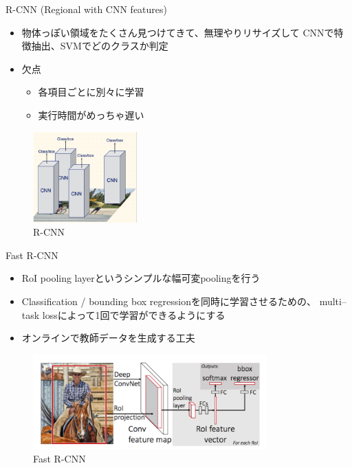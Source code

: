 \documentclass[aspectratio=169, dvipdfmx, 11pt]{beamer}
\begin{document}
\begin{frame}{R-CNN (Regional with CNN features)}
    \begin{itemize}
        \item 物体っぽい領域をたくさん見つけてきて、無理やりリサイズして
        CNNで特徴抽出、SVMでどのクラスか判定 \\
        \item 欠点 \\
        \begin{itemize}
            \item 各項目ごとに別々に学習 \\
            \item 実行時間がめっちゃ遅い \\
        \end{itemize}
    \end{itemize}
    \begin{figure}
        \centering
		\includegraphics[width=4cm]{./figures/rcnn2.png}
        \caption{R-CNN}
    \end{figure}
\end{frame}


\begin{frame}{Fast R-CNN}
    \begin{itemize}
    	\item RoI pooling layerというシンプルな幅可変poolingを行う \\
    	\item Classification / bounding box regressionを同時に学習させるための、
        multi–task lossによって1回で学習ができるようにする \\
        \item オンラインで教師データを生成する工夫 \\
    \end{itemize}
    \begin{figure}
        \centering
		\includegraphics[width=9cm]{./figures/fast_rcnn1.png}
        \caption{Fast R-CNN}
    \end{figure}
\end{frame}
\end{document}
